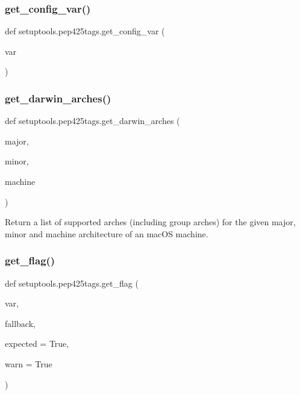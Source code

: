 \subsubsection{\texorpdfstring{get\+\_\+config\+\_\+var()}{get\_config\_var()}}
{\footnotesize\ttfamily def setuptools.\+pep425tags.\+get\+\_\+config\+\_\+var (\begin{DoxyParamCaption}\item[{}]{var }\end{DoxyParamCaption})}

\mbox{\label{namespacesetuptools_1_1pep425tags_a00fd71952d89cf14bdb56e5ba7289936}} 
\subsubsection{\texorpdfstring{get\+\_\+darwin\+\_\+arches()}{get\_darwin\_arches()}}
{\footnotesize\ttfamily def setuptools.\+pep425tags.\+get\+\_\+darwin\+\_\+arches (\begin{DoxyParamCaption}\item[{}]{major,  }\item[{}]{minor,  }\item[{}]{machine }\end{DoxyParamCaption})}

\begin{DoxyVerb}Return a list of supported arches (including group arches) for
the given major, minor and machine architecture of an macOS machine.
\end{DoxyVerb}
 \mbox{\label{namespacesetuptools_1_1pep425tags_a3ab97ebe194f0b74821cf471dc8603d5}} 
\subsubsection{\texorpdfstring{get\+\_\+flag()}{get\_flag()}}
{\footnotesize\ttfamily def setuptools.\+pep425tags.\+get\+\_\+flag (\begin{DoxyParamCaption}\item[{}]{var,  }\item[{}]{fallback,  }\item[{}]{expected = {\ttfamily True},  }\item[{}]{warn = {\ttfamily True} }\end{DoxyParamCaption})}

